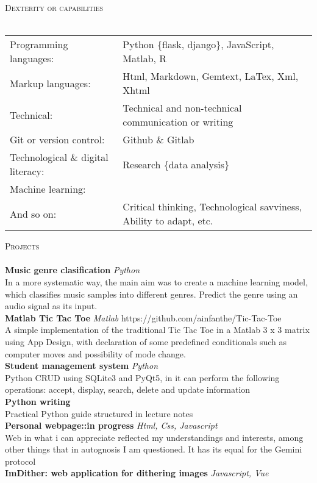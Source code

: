 \documentclass[a4paper]{article}
\newcommand{\lineunder} {
    \vspace*{-8pt} \\
    \hspace*{-18pt} \hrulefill \\
}
\newcommand{\header} [1] {
    {\hspace*{-18pt}\vspace*{6pt} \textsc{#1}}
    \vspace*{-6pt} \lineunder
}
\begin{document}
\header{Dexterity or capabilities}
\begin{tabular}{ l l }
	Programming languages:             & Python \{flask, django\}, JavaScript, Matlab, R                    \\
	Markup languages:                  & Html, Markdown, Gemtext, LaTex, Xml, Xhtml                         \\
	Technical:                         & Technical and non-technical communication or writing               \\
	Git or version control:            & Github \& Gitlab                                                   \\
	Technological \& digital literacy: & Research \{data analysis\}                                         \\
	Machine learning:                  & 								        \\
	And so on:                         & Critical thinking, Technological savviness, Ability to adapt, etc. \\
\end{tabular}
\vspace{2mm}

\header{Projects}
{\textbf{Music genre clasification}} {\sl Python} \\
In a more systematic way, the main aim was to create a machine learning model, which classifies music samples into different genres. Predict the genre using an audio signal as its input.\\
\vspace*{2mm}
{\textbf{Matlab Tic Tac Toe}} {\sl Matlab} \hfill https://github.com/ainfanthe/Tic-Tac-Toe\\
A simple implementation of the traditional Tic Tac Toe in a Matlab 3 x 3 matrix using App Design, with declaration of some predefined conditionals such as computer moves and possibility of mode change.\\
\vspace*{2mm}
{\textbf{Student management system}} {\sl Python} \\
Python CRUD using SQLite3 and PyQt5, in it can perform the following operations: accept, display, search, delete and update information\\
\vspace*{2mm}
{\textbf{Python writing}}\\
Practical Python guide structured in lecture notes\\
\vspace*{2mm}
{\textbf{Personal webpage::in progress}} {\sl Html, Css, Javascript} \\
Web in what i can appreciate reflected my understandings and interests, among other things that in autognosis I am questioned. It has its equal for the Gemini protocol\\
\vspace*{2mm}
{\textbf{Im\textquotesingle{}Dither: web application for dithering images}} {\sl Javascript, Vue} \\
\end{document}
